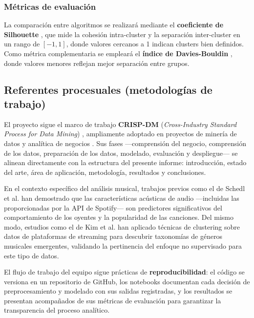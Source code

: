 \subsubsection{Métricas de evaluación}

La comparación entre algoritmos se realizará mediante el \textbf{coeficiente de Silhouette} \cite{rousseeuw1987silhouettes}, que mide la cohesión intra-cluster y la separación inter-cluster en un rango de $[-1, 1]$, donde valores cercanos a 1 indican clusters bien definidos. Como métrica complementaria se empleará el \textbf{índice de Davies-Bouldin} \cite{davies1979cluster}, donde valores menores reflejan mejor separación entre grupos.

\subsection{Referentes procesuales (metodologías de trabajo)}

El proyecto sigue el marco de trabajo \textbf{CRISP-DM} (\textit{Cross-Industry Standard Process for Data Mining}) \cite{wirth2000crisp}, ampliamente adoptado en proyectos de minería de datos y analítica de negocios \cite{choque2026}. Sus fases ---comprensión del negocio, comprensión de los datos, preparación de los datos, modelado, evaluación y despliegue--- se alinean directamente con la estructura del presente informe: introducción, estado del arte, área de aplicación, metodología, resultados y conclusiones.

En el contexto específico del análisis musical, trabajos previos como el de Schedl et al. \cite{schedl2018current} han demostrado que las características acústicas de audio ---incluidas las proporcionadas por la API de Spotify--- son predictores significativos del comportamiento de los oyentes y la popularidad de las canciones. Del mismo modo, estudios como el de Kim et al. \cite{kim2020music} han aplicado técnicas de clustering sobre datos de plataformas de streaming para descubrir taxonomías de géneros musicales emergentes, validando la pertinencia del enfoque no supervisado para este tipo de datos.

El flujo de trabajo del equipo sigue prácticas de \textbf{reproducibilidad}: el código se versiona en un repositorio de GitHub, los notebooks documentan cada decisión de preprocesamiento y modelado con sus salidas registradas, y los resultados se presentan acompañados de sus métricas de evaluación para garantizar la transparencia del proceso analítico.